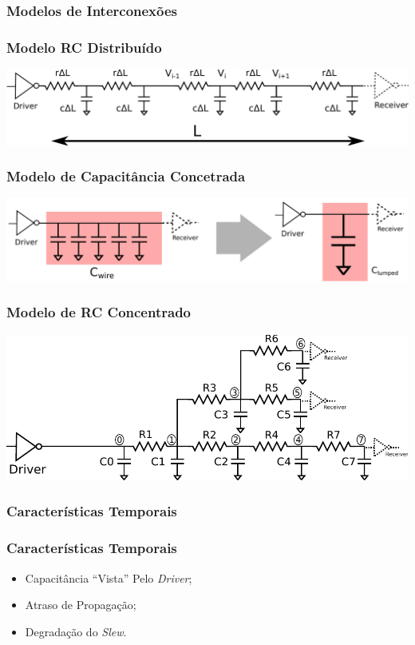 \documentclass[10pt,a4paper]{beamer}
\begin{document}
			\subsubsection*{Modelos de Interconexões}
				\begin{frame}
					\frametitle{Modelo RC Distribuído}
					\begin{center}
						\includegraphics[width=\textwidth]{img/distributed_rc.pdf} 
					\end{center}
				\end{frame}
				
				\begin{frame}
					\frametitle{Modelo de Capacitância Concetrada}
					\begin{center}
						\includegraphics[width=\textwidth]{img/lumped_c.pdf} 
					\end{center}				
				\end{frame}
				
				\begin{frame}
					\frametitle{Modelo de RC Concentrado}
					\begin{center}
						\includegraphics[width=\textwidth]{img/lumped_rc.pdf} 
					\end{center}				
				\end{frame}
			
			\subsubsection*{Características Temporais}
			\begin{frame}
				\frametitle{Características Temporais}
				
				\begin{itemize}
					\item Capacitância ``Vista'' Pelo \textit{Driver}; \pause
					\item Atraso de Propagação; \pause
					\item Degradação do \textit{Slew}. 
					
				\end{itemize}
			\end{frame}
	
\end{document}
